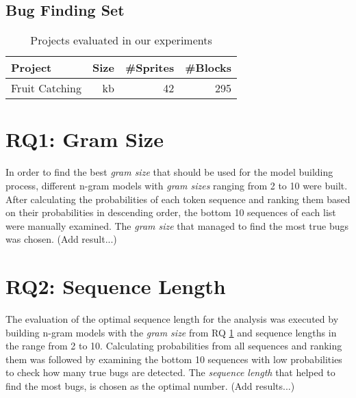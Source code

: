 \subsection{Bug Finding Set}\label{subsec:bugset}

\begin{table}[H]
    \centering
    \caption[Projects evaluated in our experiments.]{\label{tab:projects}Projects evaluated in our experiments}
    \begin{tabular}{lrrr}
        \toprule
        Project & Size & \#Sprites & \#Blocks \\
        \midrule
        Fruit Catching & kb & 42 & 295 \\
        \bottomrule
    \end{tabular}
\end{table}


\section{RQ1: Gram Size}\label{sec:gram_size}
In order to find the best \textit{gram size} that should be used for the model building process, different n-gram models with \textit{gram sizes} ranging from 2 to 10 were built. After calculating the probabilities of each token sequence and ranking them based on their probabilities in descending order, the bottom 10 sequences of each list were manually examined. The \textit{gram size} that managed to find the most true bugs was chosen. (Add result...)



\section{RQ2: Sequence Length}\label{sec:sequence_length}
The evaluation of the optimal sequence length for the analysis was executed by building n-gram models with the \textit{gram size} from RQ \ref{sec:gram_size} and {sequence lengths} in the range from 2 to 10. Calculating probabilities from all sequences and ranking them was followed by examining the bottom 10 sequences with low probabilities to check how many true bugs are detected. The \textit{sequence length} that helped to find the most bugs, is chosen as the optimal number. (Add results...)



